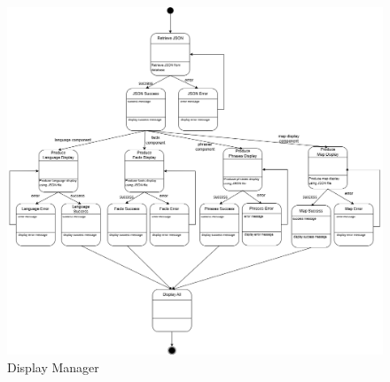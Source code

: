 \begin{figure}[H]
	\centering
	\includegraphics[width=\textwidth, height=\textheight, keepaspectratio]{Section2/images/display_manager_state_diagram.png}
	\caption{Display Manager}
	\label{DisplayManager}
\end{figure}

